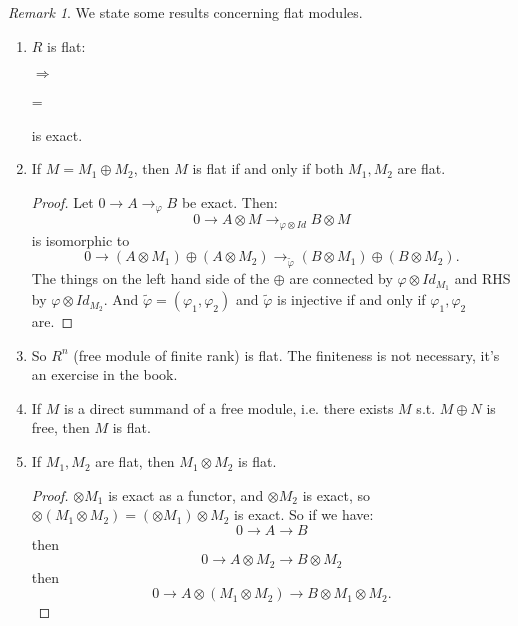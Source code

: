 \documentclass[9pt,reqno,twoside]{amsbook}
\theoremstyle{plain}
\numberwithin{section}{chapter}
\numberwithin{equation}{chapter}
\theoremstyle{definition}
\theoremstyle{remark}
\newtheorem{rem}[theorem]{Remark}
\theoremstyle{plain}
\newcommand{\tens}{\otimes}
\renewcommand{\phi}{\varphi}
\begin{document}
\begin{rem} We state some results concerning flat modules. \\
\begin{enumerate}
\item $R$ is flat:
\begin{center}
\end{center}
$\Rightarrow$
\begin{center}
\end{center}
=
\begin{center}
\end{center}
is exact. 

\item If $M = M_1 \oplus M_2$, then $M$ is flat if and only if both $M_1,M_2$ are flat. 

\begin{proof}
Let $0 \rightarrow A \rightarrow_\phi B$ be exact. Then:
$$
0 \rightarrow A \tens M \rightarrow_{\phi \tens Id} B \tens M
$$ is isomorphic to
$$
0 \to (A \tens M_1) \oplus (A \tens M_2) \to_{\tilde{\phi}} (B \tens M_1) \oplus (B \tens M_2).
$$
The things on the left hand side of the $\oplus$ are connected by $\phi \tens Id_{M_1}$ and RHS by $\phi \tens Id_{M_2}$. And $\tilde{\phi} = (\phi_1,\phi_2)$ and $\tilde{\phi}$ is injective if and only if $\phi_1,\phi_2$ are. 
\end{proof}

\item So $R^n$ (free module of finite rank) is flat. The finiteness is not necessary, it's an exercise in the book. 
\item If $M$ is a direct summand of a free module, i.e. there exists $M$ s.t. $M \oplus N$ is free, then $M$ is flat. 

\item If $M_1,M_2$ are flat, then $M_1 \tens M_2$ is flat. 

\begin{proof}
$\tens M_1$ is exact as a functor, and $\tens M_2$ is exact, so $\tens (M_1 \tens M_2) = (\tens M_1) \tens M_2$ is exact. 
So if we have:
$$
0 \to A \to B
$$
 then
 $$
 0 \to A \tens M_2 \to B \tens M_2
 $$
  then 
  $$
  0 \to A \tens (M_1 \tens M_2) \to B \tens M_1 \tens M_2.
  $$


\end{proof}
\end{enumerate}
\end{rem}
\end{document}
